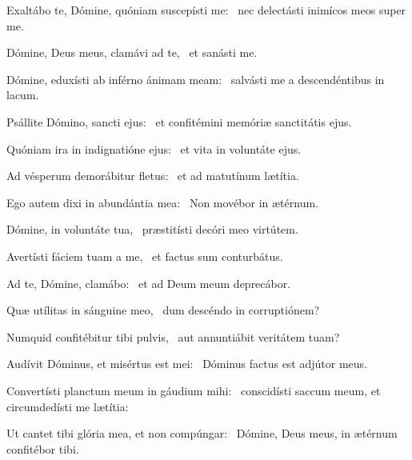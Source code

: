 \item Exaltábo te, Dómine, quóniam suscepísti me:~\psstar{} nec delectásti inimícos meos super me.

\item Dómine, Deus meus, clamávi ad te,~\psstar{} et sanásti me.

\item Dómine, eduxísti ab inférno ánimam meam:~\psstar{} salvásti me a descendéntibus in lacum.

\item Psállite Dómino, sancti ejus:~\psstar{} et confitémini memóriæ sanctitátis ejus.

\item Quóniam ira in indignatióne ejus:~\psstar{} et vita in voluntáte ejus.

\item Ad vésperum demorábitur fletus:~\psstar{} et ad matutínum lætítia.

\item Ego autem dixi in abundántia mea:~\psstar{} Non movébor in ætérnum.

\item Dómine, in voluntáte tua,~\psstar{} præstitísti decóri meo virtútem.

\item Avertísti fáciem tuam a me,~\psstar{} et factus sum conturbátus.

\item Ad te, Dómine, clamábo:~\psstar{} et ad Deum meum deprecábor.

\item Quæ utílitas in sánguine meo,~\psstar{} dum descéndo in corruptiónem?

\item Numquid confitébitur tibi pulvis,~\psstar{} aut annuntiábit veritátem tuam?

\item Audívit Dóminus, et misértus est mei:~\psstar{} Dóminus factus est adjútor meus.

\item Convertísti planctum meum in gáudium mihi:~\psstar{} conscidísti saccum meum, et circumdedísti me lætítia:

\item Ut cantet tibi glória mea, et non compúngar:~\psstar{} Dómine, Deus meus, in ætérnum confitébor tibi.

